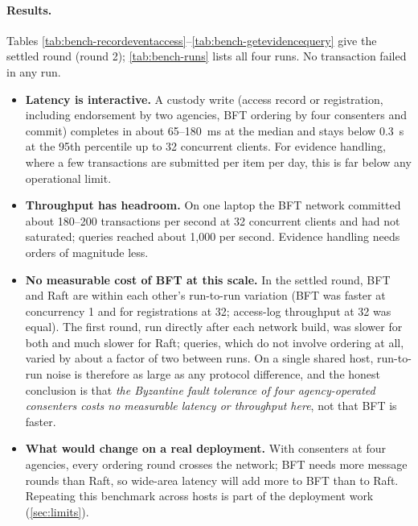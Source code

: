 \paragraph{Results.} Tables \ref{tab:bench-recordeventaccess}--\ref{tab:bench-getevidencequery} give the settled round (round 2); \cref{tab:bench-runs} lists all four runs. No transaction failed in any run.
\begin{itemize}
  \item \textbf{Latency is interactive.} A custody write (access record or registration, including endorsement by two agencies, BFT ordering by four consenters and commit) completes in about 65--180~ms at the median and stays below 0.3~s at the 95th percentile up to 32 concurrent clients. For evidence handling, where a few transactions are submitted per item per day, this is far below any operational limit.
  \item \textbf{Throughput has headroom.} On one laptop the BFT network committed about 180--200 transactions per second at 32 concurrent clients and had not saturated; queries reached about 1{,}000 per second. Evidence handling needs orders of magnitude less.
  \item \textbf{No measurable cost of BFT at this scale.} In the settled round, BFT and Raft are within each other's run-to-run variation (BFT was faster at concurrency 1 and for registrations at 32; access-log throughput at 32 was equal). The first round, run directly after each network build, was slower for both and much slower for Raft; queries, which do not involve ordering at all, varied by about a factor of two between runs. On a single shared host, run-to-run noise is therefore as large as any protocol difference, and the honest conclusion is that \emph{the Byzantine fault tolerance of four agency-operated consenters costs no measurable latency or throughput here}, not that BFT is faster.
  \item \textbf{What would change on a real deployment.} With consenters at four agencies, every ordering round crosses the network; BFT needs more message rounds than Raft, so wide-area latency will add more to BFT than to Raft. Repeating this benchmark across hosts is part of the deployment work (\cref{sec:limits}).
\end{itemize}

